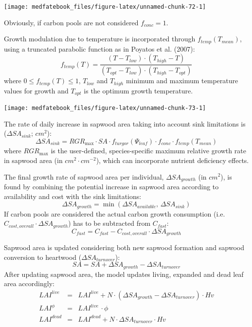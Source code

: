 \documentclass[]{book}
\begin{document}
\begin{center}\texttt{[image: medfatebook\_files/figure-latex/unnamed-chunk-72-1]} \end{center}

Obviously, if carbon pools are not considered \(f_{conc} = 1\).

Growth modulation due to temperature is incorporated through \(f_{temp}(T_{mean})\), using a truncated parabolic function as in Poyatos et al. (2007):
\begin{equation}
f_{temp}(T) = \frac{(T-T_{low}) \cdot (T_{high}-T)}{(T_{opt}-T_{low}) \cdot (T_{high}-T_{opt})}
\end{equation}
where \(0 \leq f_{temp}(T) \leq 1\), \(T_{low}\) and \(T_{high}\) minimum and maximum temperature values for growth and \(T_{opt}\) is the optimum growth temperature.

\begin{center}\texttt{[image: medfatebook\_files/figure-latex/unnamed-chunk-73-1]} \end{center}

The rate of daily increase in sapwood area taking into account sink limitations is (\(\Delta SA_{sink}\); \(cm^2\)):
\begin{equation}
\Delta SA_{sink} = RGR_{\max} \cdot SA \cdot f_{turgor}(\Psi_{leaf}) \cdot f_{conc} \cdot f_{temp}(T_{mean})
\end{equation}
where \(RGR_{\max}\) is the user-defined, species-specific maximum relative growth rate in sapwood area (in \(cm^2·cm^{-2}\)), which can incorporate nutrient deficiency effects.

The final growth rate of sapwood area per individual, \(\Delta SA_{growth}\) (in \(cm^2\)), is found by combining the potential increase in sapwood area according to availability and cost with the sink limitations:
\begin{equation}
\Delta SA_{growth} = \min(\Delta SA_{available}, \, \Delta SA_{sink})
\end{equation}
If carbon pools are considered the actual carbon growth consumption (i.e. \(C_{cost,overall} \cdot \Delta SA_{growth}\)) has to be subtracted from \(C_{fast}\):
\begin{equation}
C_{fast} = C_{fast} - C_{cost,overall} \cdot \Delta SA_{growth}
\end{equation}

Sapwood area is updated considering both new sapwood formation and sapwood conversion to heartwood (\(\Delta SA_{turnover}\)):
\begin{equation}
SA = SA + \Delta SA_{growth} - \Delta SA_{turnover} 
\end{equation}
After updating sapwood area, the model updates living, expanded and dead leaf area accordingly:
\begin{eqnarray}
LAI^{live} &=& LAI^{live} + N \cdot (\Delta SA_{growth} - \Delta SA_{turnover}) \cdot Hv \\
LAI^{\phi} &=& LAI^{live}\,\cdot\phi \\
LAI^{dead} &=& LAI^{dead} + N \cdot \Delta SA_{turnover} \cdot Hv 
\end{eqnarray}
\end{document}

